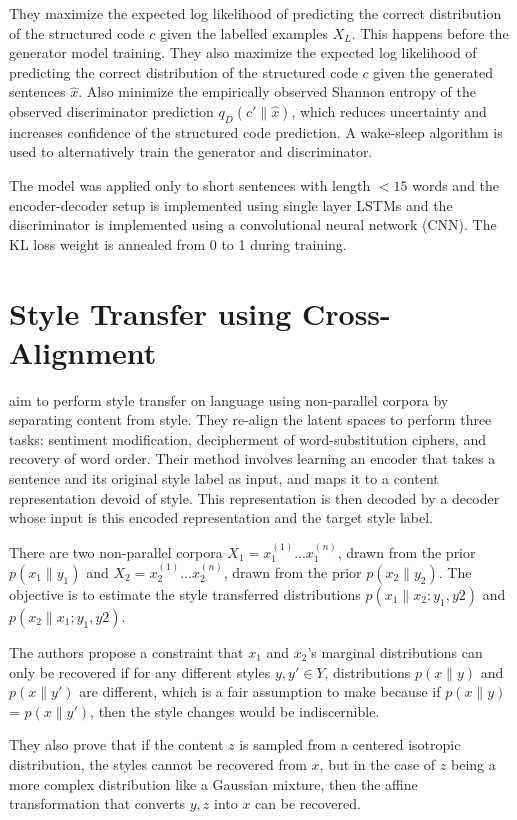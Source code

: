 They maximize the expected log likelihood of predicting the correct distribution of the structured code $c$ given the labelled examples $X_L$. This happens before the generator model training. They also maximize the expected log likelihood of predicting the correct distribution of the structured code $c$ given the generated sentences $\hat{x}$. Also minimize the empirically observed Shannon entropy of the observed discriminator prediction $q_D(c'\|\hat{x})$, which reduces uncertainty and increases confidence of the structured code prediction. A wake-sleep algorithm \citep{hinton1995wake} is used to alternatively train the generator and discriminator.

The model was applied only to short sentences with length $<15$ words and the encoder-decoder setup is implemented using single layer LSTMs and the discriminator is implemented using a convolutional neural network (CNN). The KL loss weight is annealed from 0 to 1 during training.


\section{Style Transfer using Cross-Alignment}

\cite{shen2017style} aim to perform style transfer on language using non-parallel corpora by separating content from style. They re-align the latent spaces to perform three tasks: sentiment modification, decipherment of word-substitution ciphers, and recovery of word order. Their method involves learning an encoder that takes a sentence and its original style label as input, and maps it to a content representation devoid of style. This representation is then decoded by a decoder whose input is this encoded representation and the target style label.

There are two non-parallel corpora $X_1 = {x_1^{(1)} ... x_1^{(n)}}$, drawn from the prior $p(x_1\|y_1)$ and $X_2 = {x_2^{(1)} ... x_2^{(n)}}$, drawn from the prior $p(x_2\|y_2)$. The objective is to estimate the style transferred distributions $p(x_1\|x_2;y_1,y2)$ and $p(x_2\|x_1;y_1,y2)$.

The authors propose a constraint that $x_1$ and $x_2$'s marginal distributions can only be recovered if for any different styles $y, y' \in Y$, distributions $p(x\|y)$ and $p(x\|y')$ are different, which is a fair assumption to make because if $p(x\|y)$ = $p(x\|y')$, then the style changes would be indiscernible.

They also prove that if the content $z$ is sampled from a centered isotropic distribution, the styles cannot be recovered from $x$, but in the case of $z$ being a more complex distribution like a Gaussian mixture, then the affine transformation that converts $y, z$ into $x$ can be recovered.

